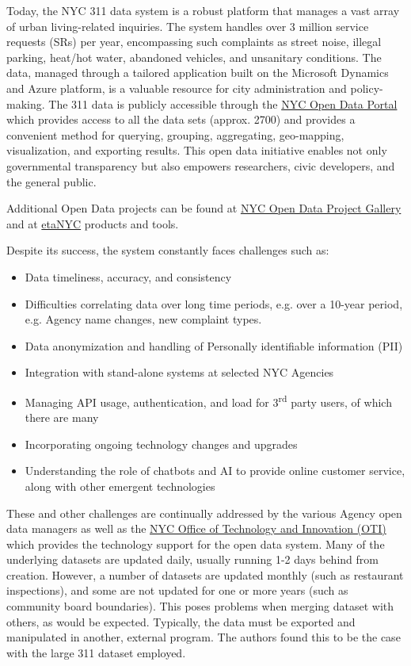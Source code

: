 \documentclass[12pt, titlepage]{article}
\begin{document}
Today, the NYC 311 data system is a robust platform that manages a
vast array of urban living-related inquiries. The system handles over 3 million service 
requests (SRs) per year, encompassing such complaints as street noise, illegal parking, heat/hot water, abandoned vehicles,
and unsanitary conditions. The data, managed through a tailored application built on the Microsoft Dynamics and Azure platform, is a valuable resource for city
administration and policy-making. The 311 data is publicly accessible through the 
\href{https://opendata.cityofnewyork.us/}{NYC Open Data Portal} which provides access
to all the data sets (approx. 2700) and provides a convenient method for querying, grouping, aggregating, geo-mapping, visualization, and exporting
results. This open data initiative enables not only governmental transparency but also empowers 
researchers, civic developers, and the general public. 

Additional Open Data projects can be found at \href{https://opendata.cityofnewyork.us/projects/}{NYC Open Data Project Gallery}
and at \href{https://beta.nyc/beta/products/}{\textbeta etaNYC} products and tools.

Despite its success, the system constantly faces challenges such as:

\begin{itemize}
	\item Data timeliness, accuracy, and consistency
	\item Difficulties correlating data over long time periods, e.g. over a 10-year period, e.g. Agency name changes, new complaint types.
	\item Data anonymization and handling of Personally identifiable information (PII)
	\item Integration with stand-alone systems at selected NYC Agencies
	\item Managing API usage, authentication, and load for 3\textsuperscript{rd} party users, of which there are many
	\item Incorporating ongoing technology changes and upgrades 
	\item Understanding the role of chatbots and AI to provide online customer service, along with other emergent technologies
\end{itemize}

These and other challenges are continually addressed by the various Agency open data managers
as well as the \href{https://www.nyc.gov/content/oti/pages/}{NYC Office of Technology and Innovation (OTI)} which
provides the technology support for the open data system.  
Many of the underlying datasets are updated daily, usually running 1-2 days behind from creation.
However, a number of datasets are updated monthly (such as restaurant inspections), and some are
not updated for one or more years (such as community board boundaries). This poses problems when 
merging dataset with others, as would be expected. Typically, the data must be
exported and manipulated in another, external program. The authors found this to be the case with 
the large 311 dataset employed.
\end{document}
